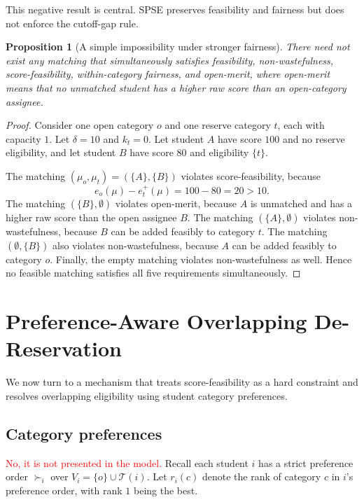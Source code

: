 \documentclass[12pt]{article}
\newtheorem{proposition}{Proposition}
\newcommand{\T}{\mathcal{T}}
\newcommand{\1}{\mathbf{1}}
\begin{document}
This negative result is central. SPSE preserves feasibility and fairness but does not enforce the cutoff-gap rule.

\begin{proposition}[A simple impossibility under stronger fairness]
\label{prop:simple-impossibility}
There need not exist any matching that simultaneously satisfies feasibility, non-wastefulness, score-feasibility, within-category fairness, and open-merit, where open-merit means that no unmatched student has a higher raw score than an open-category assignee.
\end{proposition}

\begin{proof}
Consider one open category $o$ and one reserve category $t$, each with capacity $1$. Let $\delta=10$ and $k_t=0$. Let student $A$ have score $100$ and no reserve eligibility, and let student $B$ have score $80$ and eligibility $\{t\}$.

The matching $(\mu_o,\mu_t)=(\{A\},\{B\})$ violates score-feasibility, because
\[
e_o(\mu)-e_t^+(\mu)=100-80=20>10.
\]
The matching $(\{B\},\emptyset)$ violates open-merit, because $A$ is unmatched and has a higher raw score than the open assignee $B$. The matching $(\{A\},\emptyset)$ violates non-wastefulness, because $B$ can be added feasibly to category $t$. The matching $(\emptyset,\{B\})$ also violates non-wastefulness, because $A$ can be added feasibly to category $o$. Finally, the empty matching violates non-wastefulness as well. Hence no feasible matching satisfies all five requirements simultaneously.
\end{proof}

\section{Preference-Aware Overlapping De-Reservation}

We now turn to a mechanism that treats score-feasibility as a hard constraint and resolves overlapping eligibility using student category preferences.

\subsection{Category preferences}
\textcolor{red}{No, it is not presented in the model.}
Recall each student $i$ has a strict preference order $\succ_i$ over $V_i=\{o\}\cup\T(i)$.
Let $r_i(c)$ denote the rank of category $c$ in $i$'s preference order, with rank $1$ being the best.
\end{document}
